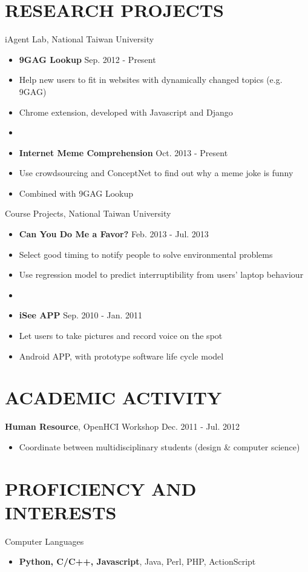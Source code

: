 \documentclass[margin]{main}
\begin{document}
\begin{resume}
\section{RESEARCH PROJECTS}
iAgent Lab, National Taiwan University
\begin{itemize} \itemsep -2pt
    \item[] {\bf 9GAG Lookup} \hfill Sep. 2012 - Present
    \item[] Help new users to fit in websites with dynamically changed topics (e.g. 9GAG)
    \item[] Chrome extension, developed with Javascript and Django
    \item[]
    \item[] {\bf Internet Meme Comprehension} \hfill Oct. 2013 - Present
    \item[] Use crowdsourcing and ConceptNet to find out why a meme joke is funny
    \item[] Combined with 9GAG Lookup
\end{itemize}

Course Projects, National Taiwan University
\begin{itemize} \itemsep -2pt
    \item[] {\bf Can You Do Me a Favor?} \hfill Feb. 2013 - Jul. 2013
    \item[] Select good timing to notify people to solve environmental problems
    \item[] Use regression model to predict interruptibility from users' laptop behaviour
    \item[]
    \item[] {\bf iSee APP} \hfill Sep. 2010 - Jan. 2011
    \item[] Let users to take pictures and record voice on the spot
    \item[] Android APP, with prototype software life cycle model
\end{itemize}


\section{ACADEMIC ACTIVITY}
{\bf Human Resource}, OpenHCI Workshop \hfill Dec. 2011 - Jul. 2012
\begin{itemize} \itemsep -2pt
    \item[] Coordinate between multidisciplinary students (design \& computer science)
\end{itemize}


\section{PROFICIENCY AND INTERESTS}
Computer Languages
\begin{itemize} \itemsep -2pt
    \item[] {\bf Python, C/C++, Javascript}, Java, Perl, PHP, ActionScript
\end{itemize}


\end{resume}
\end{document}
